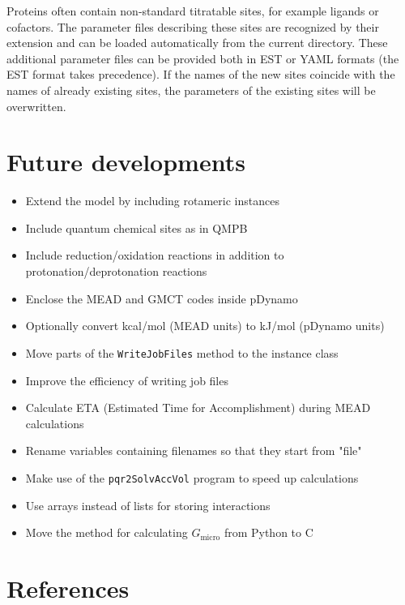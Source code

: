 \documentclass[a4paper,11pt]{article}
\begin{document}
Proteins often contain non-standard titratable sites, for example ligands or cofactors.
%
The parameter files describing these sites are recognized by their extension and can be
loaded automatically from the current directory.
%
These additional parameter files can be provided both in EST or YAML formats (the EST format
takes precedence).
%
If the names of the new sites coincide with the names of already existing sites, the
parameters of the existing sites will be overwritten.


\section{Future developments}
\linespread{0.8}

\begin{itemize}
  \setlength{\itemsep}{1.0pt}
  \item Extend the model by including rotameric instances
  \item Include quantum chemical sites as in QMPB
  \item Include reduction/oxidation reactions in addition to protonation/deprotonation reactions
  \item Enclose the MEAD and GMCT codes inside pDynamo
  \item Optionally convert kcal/mol (MEAD units) to kJ/mol (pDynamo units)
  \item Move parts of the \texttt{WriteJobFiles} method to the instance class
  \item Improve the efficiency of writing job files
  \item Calculate ETA (Estimated Time for Accomplishment) during MEAD calculations
  \item Rename variables containing filenames so that they start from "file"
  \item Make use of the \texttt{pqr2SolvAccVol} program to speed up calculations 
  \item Use arrays instead of lists for storing interactions
  \item Move the method for calculating $G_{\mathrm{micro}}$ from Python to C
\end{itemize}

\linespread{1.6}


\section{References}
\renewcommand{\refname}{}
\vspace*{-1cm}
\end{document}
